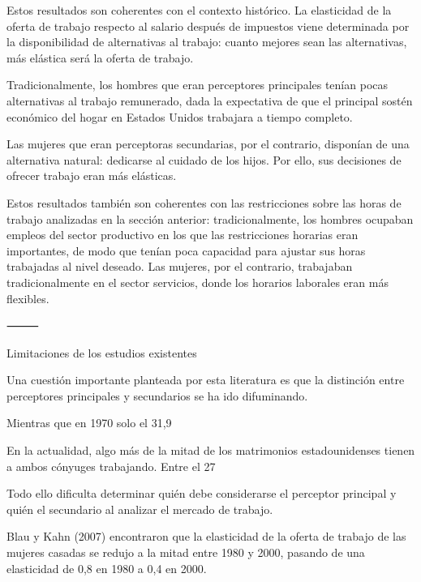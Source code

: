 \documentclass[10pt,a4paper]{article}
\begin{document}
Estos resultados son coherentes con el contexto histórico. La elasticidad de la oferta de trabajo respecto al salario después de impuestos viene determinada por la disponibilidad de alternativas al trabajo: cuanto mejores sean las alternativas, más elástica será la oferta de trabajo.

Tradicionalmente, los hombres que eran perceptores principales tenían pocas alternativas al trabajo remunerado, dada la expectativa de que el principal sostén económico del hogar en Estados Unidos trabajara a tiempo completo.

Las mujeres que eran perceptoras secundarias, por el contrario, disponían de una alternativa natural: dedicarse al cuidado de los hijos. Por ello, sus decisiones de ofrecer trabajo eran más elásticas.

Estos resultados también son coherentes con las restricciones sobre las horas de trabajo analizadas en la sección anterior: tradicionalmente, los hombres ocupaban empleos del sector productivo en los que las restricciones horarias eran importantes, de modo que tenían poca capacidad para ajustar sus horas trabajadas al nivel deseado. Las mujeres, por el contrario, trabajaban tradicionalmente en el sector servicios, donde los horarios laborales eran más flexibles.

⸻

Limitaciones de los estudios existentes

Una cuestión importante planteada por esta literatura es que la distinción entre perceptores principales y secundarios se ha ido difuminando.

Mientras que en 1970 solo el 31,9 %

En la actualidad, algo más de la mitad de los matrimonios estadounidenses tienen a ambos cónyuges trabajando. Entre el 27 %

Todo ello dificulta determinar quién debe considerarse el perceptor principal y quién el secundario al analizar el mercado de trabajo.

Blau y Kahn (2007) encontraron que la elasticidad de la oferta de trabajo de las mujeres casadas se redujo a la mitad entre 1980 y 2000, pasando de una elasticidad de 0,8 en 1980 a 0,4 en 2000.
\end{document}
